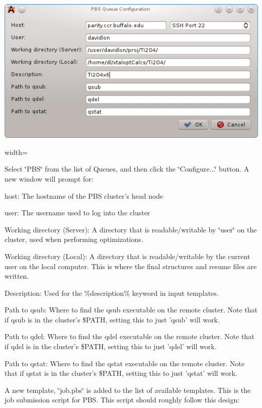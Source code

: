 \begin{DoxyImage}
\includegraphics{opt-set-pbs.png}
\caption{width=}
\end{DoxyImage}


Select \char`\"{}\-P\-B\-S\char`\"{} from the list of Queues, and then click the \char`\"{}\-Configure...\char`\"{} button. A new window will prompt for\-:
\begin{DoxyItemize}
\item host\-: The hostname of the P\-B\-S cluster's head node
\item user\-: The username used to log into the cluster
\item Working directory (Server)\-: A directory that is readable/writable by \char`\"{}user\char`\"{} on the cluster, used when performing optimizations.
\item Working directory (Local)\-: A directory that is readable/writable by the current user on the local computer. This is where the final structures and resume files are written.
\item Description\-: Used for the \%description\% keyword in input templates.
\item Path to qsub\-: Where to find the qsub executable on the remote cluster. Note that if qsub is in the cluster's \$\-P\-A\-T\-H, setting this to just 'qsub' will work.
\item Path to qdel\-: Where to find the qdel executable on the remote cluster. Note that if qdel is in the cluster's \$\-P\-A\-T\-H, setting this to just 'qdel' will work.
\item Path to qstat\-: Where to find the qstat executable on the remote cluster. Note that if qstat is in the cluster's \$\-P\-A\-T\-H, setting this to just 'qstat' will work.
\end{DoxyItemize}

A new template, \char`\"{}job.\-pbs\char`\"{} is added to the list of available templates. This is the job submission script for P\-B\-S. This script should roughly follow this design\-:


